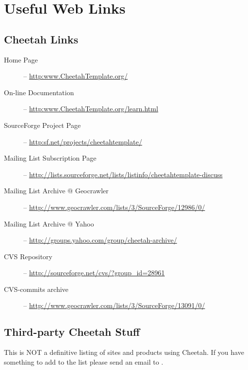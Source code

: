 \section{Useful Web Links}
\label{links}


\subsection{Cheetah Links}
\label{links.cheetah}

\begin{description}
\item[Home Page] -- \url{http:www.CheetahTemplate.org/}
     
\item[On-line Documentation] -- \url{http:www.CheetahTemplate.org/learn.html}
     
\item[SourceForge Project Page] -- \url{http:sf.net/projects/cheetahtemplate/}
     
\item[Mailing List Subscription Page] --
     \url{http://lists.sourceforge.net/lists/listinfo/cheetahtemplate-discuss}
     
\item[Mailing List Archive @ Geocrawler] --
     \url{http://www.geocrawler.com/lists/3/SourceForge/12986/0/}

\item[Mailing List Archive @ Yahoo] --
     \url{http://groups.yahoo.com/group/cheetah-archive/}
    
\item[CVS Repository] -- \url{http://sourceforge.net/cvs/?group_id=28961}
     
\item[CVS-commits archive] --
     \url{http://www.geocrawler.com/lists/3/SourceForge/13091/0/}

\end{description}

\subsection{Third-party Cheetah Stuff}
\label{links.cheetah}

This is NOT a definitive listing of sites and products using Cheetah. If you
have something to add to the list please send an email to
.

